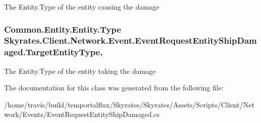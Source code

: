 The Entity.\-Type of the entity causing the damage 

\hypertarget{class_skyrates_1_1_client_1_1_network_1_1_event_1_1_event_request_entity_ship_damaged_a354ad9e86575579cb021377c64f28ec6}{
\subsubsection[{Target\-Entity\-Type}]{\setlength{\rightskip}{0pt plus 5cm}Common.\-Entity.\-Entity.\-Type Skyrates.\-Client.\-Network.\-Event.\-Event\-Request\-Entity\-Ship\-Damaged.\-Target\-Entity\-Type\hspace{0.3cm}{\ttfamily [get]}, {\ttfamily [set]}}}\label{class_skyrates_1_1_client_1_1_network_1_1_event_1_1_event_request_entity_ship_damaged_a354ad9e86575579cb021377c64f28ec6}


The Entity.\-Type of the entity taking the damage 



The documentation for this class was generated from the following file\-:\begin{DoxyCompactItemize}
\item 
/home/travis/build/temportalflux/\-Skyrates/\-Skyrates/\-Assets/\-Scripts/\-Client/\-Network/\-Events/Event\-Request\-Entity\-Ship\-Damaged.\-cs\end{DoxyCompactItemize}
